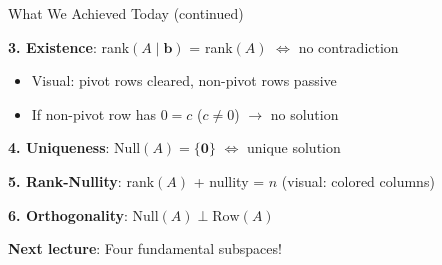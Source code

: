 \documentclass[10pt]{beamer}
\theoremstyle{definition}
\newcommand{\x}[1]{\alert{\textbf{#1}}}
\begin{document}
\begin{frame}{What We Achieved Today (continued)}

\x{3. Existence}: rank$(A \mid \mathbf{b})$ = rank$(A)$ $\iff$ no contradiction

\begin{itemize}
\item Visual: pivot rows cleared, non-pivot rows passive
\item If non-pivot row has $0 = c$ ($c \neq 0$) $\to$ no solution
\end{itemize}

\vspace{0.5em}

\x{4. Uniqueness}: $\text{Null}(A) = \{\mathbf{0}\}$ $\iff$ unique solution

\vspace{0.5em}

\x{5. Rank-Nullity}: rank$(A)$ + nullity = $n$ (visual: colored columns)

\vspace{0.5em}

\x{6. Orthogonality}: $\text{Null}(A) \perp \text{Row}(A)$

\vspace{1em}

\x{Next lecture}: Four fundamental subspaces!

\end{frame}
\end{document}
